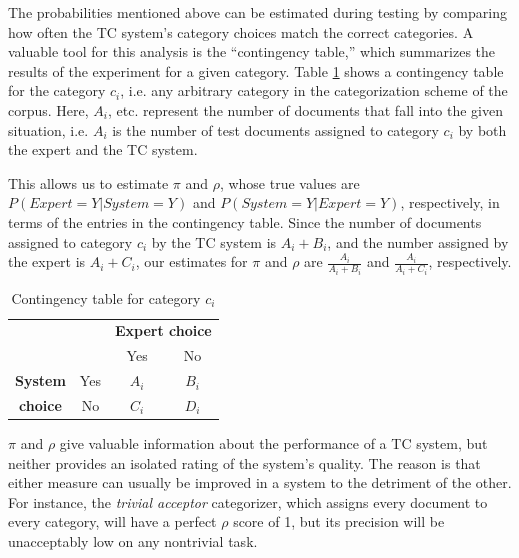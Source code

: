 The probabilities mentioned above can be estimated during testing by
comparing how often the TC system's category choices match the correct
categories.  A valuable tool for this analysis is the ``contingency
table,'' which summarizes the results of the experiment for a given
category.  Table \ref{onecat-contingency} shows a contingency table
for the category $c_i$, i.e. any arbitrary category in the
categorization scheme of the corpus.  Here, $A_i$, etc. represent the
number of documents that fall into the given situation, i.e. $A_i$ is
the number of test documents assigned to category $c_i$ by both the
expert and the TC system.

This allows us to estimate $\pi$ and $\rho$, whose true values are
$P(Expert=Y | System=Y)$ and $P(System=Y | Expert=Y)$, respectively,
in terms of the entries in the contingency table.  Since the number of
documents assigned to category $c_i$ by the TC system is $A_i+B_i$,
and the number assigned by the expert is $A_i+C_i$, our estimates for
$\pi$ and $\rho$ are $\frac{A_i}{A_i + B_i}$ and $\frac{A_i}{A_i +
C_i}$, respectively.



\begin{table}
\begin{center}
\begin{tabular}{|c|c|c|c|}
\cline{3-4}
\multicolumn{2}{c|}{} & \multicolumn{2}{c|}{\textbf{Expert choice}} \\
\cline{3-4}
\multicolumn{2}{c|}{} & Yes & No \\
\hline
\textbf{System} & Yes & $A_i$ & $B_i$ \\
\cline{2-4}
\textbf{choice} & No  & $C_i$ & $D_i$ \\
\hline
\end{tabular}
\end{center}
\caption{Contingency table for category $c_i$}
\label{onecat-contingency}
\end{table}


$\pi$ and $\rho$ give valuable information about the performance of a
TC system, but neither provides an isolated rating of the system's
quality.  The reason is that either measure can usually be improved in
a system to the detriment of the other.\cite[p. 35]{sebastiani:02} For
instance, the \emph{trivial acceptor} categorizer, which assigns every
document to every category, will have a perfect $\rho$ score of 1, but
its precision will be unacceptably low on any nontrivial task.

